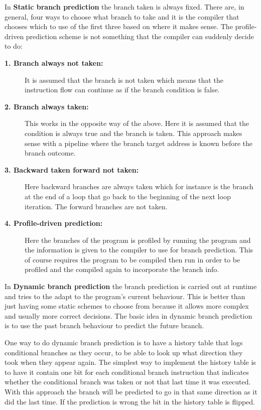 In \textbf{Static branch prediction} the branch taken is always fixed.
There are, in general, four ways to choose what branch to take and it is the compiler that chooses which to use of the first three based on where it makes sense. 
The profile-driven prediction scheme is not something that the compiler can suddenly decide to do:
\begin{description}
\item[\textbf{1. Branch always not taken:}] It is assumed that the branch is not taken which means that the instruction flow can continue as if the branch condition is false.

\item[\textbf{2. Branch always taken:}] This works in the opposite way of the above. Here it is assumed that the condition is always true and the branch is taken. This approach makes sense with a pipeline where the branch target address is known before the branch outcome.

\item[\textbf{3. Backward taken forward not taken:}] Here backward branches are always taken which for instance is the branch at the end of a loop that go back to the beginning of the next loop iteration.
The forward branches are not taken. 

\item[\textbf{4. Profile-driven prediction:}]
Here the branches of the program is profiled by running the program and the information is given to the compiler to use for branch prediction. This of course requires the program to be compiled then run in order to be profiled and the compiled again to incorporate the branch info.
\end{description}

In \textbf{Dynamic branch prediction} the branch prediction is carried out at runtime and tries to the adapt to the program's current behaviour.
This is better than just having some static schemes to choose from because it allows more complex and usually more correct decisions.
The basic idea in dynamic branch prediction is to use the past branch behaviour to predict the future branch.

One way to do dynamic branch prediction is to have a history table that logs conditional branches as they occur, to be able to look up what direction they took when they appear again.
The simplest way to implement the history table is to have it contain one bit for each conditional branch instruction that indicates whether the conditional branch was taken or not that last time it was executed.
With this approach the branch will be predicted to go in that same direction as it did the last time. 
If the prediction is wrong the bit in the history table is flipped.

